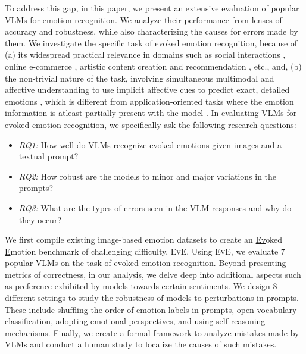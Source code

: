 To address this gap, in this paper, we present an extensive evaluation of popular VLMs for emotion recognition. We analyze their performance from lenses of accuracy and robustness, while also characterizing the causes for errors made by them. We investigate the specific task of evoked emotion recognition, because of (a) its widespread practical relevance in domains such as social interactions \cite{wieser2012reduced, jyoti2016survey, awal2021angrybert}, online e-commerce \cite{sanchez2020opinion}, artistic content creation and recommendation \cite{wang2023unlocking}, etc., and, (b) the non-trivial nature of the task, involving simultaneous multimodal and affective understanding to use implicit affective cues to predict exact, detailed emotions \cite{wang2023unlocking}, which is different from application-oriented tasks where the emotion information is atleast partially present with the model \cite{deng2023socratis, li2024enhancing}. In evaluating VLMs for evoked emotion recognition, we specifically ask the following research questions:  
\begin{itemize}
    \item \textit{RQ1:} How well do VLMs recognize evoked emotions given images and a textual prompt? 
    \item \textit{RQ2:} How robust are the models to minor and major variations in the prompts? 
    \item \textit{RQ3:} What are the types of errors seen in the VLM responses and why do they occur? 
\end{itemize}

We first compile existing image-based emotion datasets to create an \underline{Ev}oked \underline{E}motion benchmark of challenging difficulty, \textsc{EvE}. Using \textsc{EvE}, we evaluate 7 popular VLMs on the task of evoked emotion recognition. Beyond presenting metrics of correctness, in our analysis, we delve deep into additional aspects such as preference exhibited by models towards certain sentiments. We design 8 different settings to study the robustness of models to perturbations in prompts. These include shuffling the order of emotion labels in prompts, open-vocabulary classification, adopting emotional perspectives, and using self-reasoning mechanisms. Finally, we create a formal framework to analyze mistakes made by VLMs and conduct a human study to localize the causes of such mistakes. 

